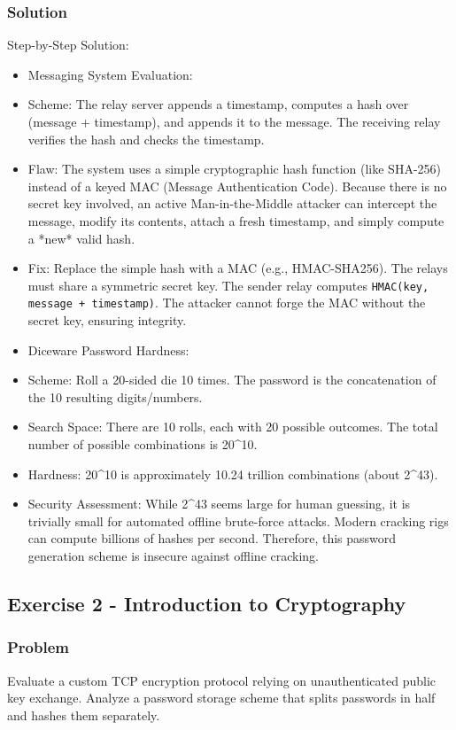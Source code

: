 \documentclass{article}
\begin{document}
\subsubsection*{Solution}
Step-by-Step Solution:

\begin{itemize}
    \item[\textbf{1.}] Messaging System Evaluation:
    \item Scheme: The relay server appends a timestamp, computes a hash over (message + timestamp), and appends it to the message. The receiving relay verifies the hash and checks the timestamp.
    \item Flaw: The system uses a simple cryptographic hash function (like SHA-256) instead of a keyed MAC (Message Authentication Code). Because there is no secret key involved, an active Man-in-the-Middle attacker can intercept the message, modify its contents, attach a fresh timestamp, and simply compute a *new* valid hash.
    \item Fix: Replace the simple hash with a MAC (e.g., HMAC-SHA256). The relays must share a symmetric secret key. The sender relay computes \texttt{HMAC(key, message + timestamp)}. The attacker cannot forge the MAC without the secret key, ensuring integrity.

    \item[\textbf{2.}] Diceware Password Hardness:
    \item Scheme: Roll a 20-sided die 10 times. The password is the concatenation of the 10 resulting digits/numbers.
    \item Search Space: There are 10 rolls, each with 20 possible outcomes. The total number of possible combinations is 20\textasciicircum{}10.
    \item Hardness: 20\textasciicircum{}10 is approximately 10.24 trillion combinations (about 2\textasciicircum{}43).
    \item Security Assessment: While 2\textasciicircum{}43 seems large for human guessing, it is trivially small for automated offline brute-force attacks. Modern cracking rigs can compute billions of hashes per second. Therefore, this password generation scheme is insecure against offline cracking.
\end{itemize}

\subsection{Exercise 2 - Introduction to Cryptography}
\subsubsection*{Problem}
Evaluate a custom TCP encryption protocol relying on unauthenticated public key exchange. Analyze a password storage scheme that splits passwords in half and hashes them separately.
\end{document}

